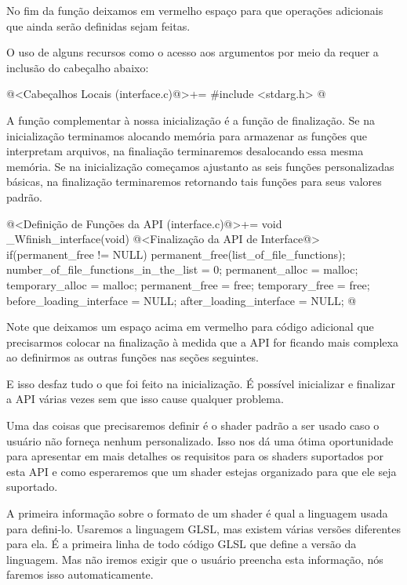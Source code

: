 No fim da função deixamos em vermelho espaço para que operações
adicionais que ainda serão definidas sejam feitas.

O uso de alguns recursos como o acesso aos argumentos por meio da
 requer a inclusão do cabeçalho abaixo:

\iniciocodigo
@<Cabeçalhos Locais (interface.c)@>+=
#include <stdarg.h>
@
\fimcodigo


A função complementar à nossa inicialização é a função de
finalização. Se na inicialização terminamos alocando memória para
armazenar as funções que interpretam arquivos, na finaliação
terminaremos desalocando essa mesma memória. Se na inicialização
começamos ajustanto as seis funções personalizadas básicas, na
finalização terminaremos retornando tais funções para seus valores
padrão.

\iniciocodigo
@<Definição de Funções da API (interface.c)@>+=
void _Wfinish_interface(void){
  @<Finalização da API de Interface@>
  if(permanent_free != NULL)
    permanent_free(list_of_file_functions);
  number_of_file_functions_in_the_list = 0;
  permanent_alloc = malloc;
  temporary_alloc = malloc;
  permanent_free = free;
  temporary_free = free;
  before_loading_interface = NULL;
  after_loading_interface = NULL;
}
@
\fimcodigo

Note que deixamos um espaço acima em vermelho para código adicional
que precisarmos colocar na finalização à medida que a API for ficando
mais complexa ao definirmos as outras funções nas seções seguintes.

E isso desfaz tudo o que foi feito na inicialização. É possível
inicializar e finalizar a API várias vezes sem que isso cause qualquer
problema.


Uma das coisas que precisaremos definir é o shader padrão a ser usado
caso o usuário não forneça nenhum personalizado. Isso nos dá uma ótima
oportunidade para apresentar em mais detalhes os requisitos para os
shaders suportados por esta API e como esperaremos que um shader
estejas organizado para que ele seja suportado.

A primeira informação sobre o formato de um shader é qual a linguagem
usada para defini-lo. Usaremos a linguagem GLSL, mas existem várias
versões diferentes para ela. É a primeira linha de todo código GLSL
que define a versão da linguagem. Mas não iremos exigir que o usuário
preencha esta informação, nós faremos isso automaticamente.

